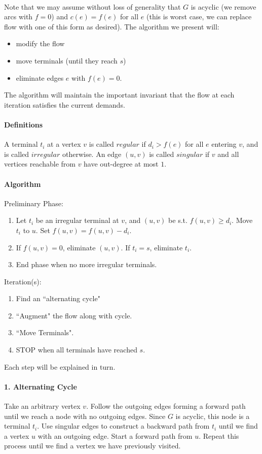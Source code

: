 \documentclass[letterpaper,12pt,oneside,onecolumn]{article}
\begin{document}
\paragraph{}
Note that we may assume without loss of generality that $G$ is acyclic (we remove arcs with $f=0$) and $c(e) = f(e)$ for all $e$ (this is worst case, we can replace flow with one of this form as desired). The algorithm we present will:
\begin{itemize}
\item modify the flow
\item move terminals (until they reach $s$)
\item eliminate edges $e$ with $f(e) = 0$.
\end{itemize}
The algorithm will maintain the important invariant that the flow at each iteration satisfies the current demands.
\paragraph{Definitions}
A terminal $t_i$ at a vertex $v$ is called $\textit{regular}$ if $d_i > f(e)$ for all $e$ entering $v$, and is called $\textit{irregular}$ otherwise. An edge $(u,v)$ is called $\textit{singular}$ if $v$ and all vertices reachable from $v$ have out-degree at most $1$.
\paragraph{Algorithm}
Preliminary Phase:
\begin{enumerate}
\item Let $t_i$ be an irregular terminal at $v$, and $(u,v)$ be s.t. $f(u,v) \geq d_i$. Move $t_i$ to $u$. Set $f(u,v) = f(u,v) - d_i$.
\item If $f(u,v) = 0$, eliminate $(u,v)$. If $t_i = s$, eliminate $t_i$.
\item End phase when no more irregular terminals.
\end{enumerate}
Iteration(s):
\begin{enumerate}
\item Find an ``alternating cycle"
\item ``Augment" the flow along with cycle.
\item ``Move Terminals".
\item STOP when all terminals have reached $s$.
\end{enumerate}
Each step will be explained in turn.
\paragraph{1. Alternating Cycle}
Take an arbitrary vertex $v$. Follow the outgoing edges forming a forward path until we reach a node with no outgoing edges. Since $G$ is acyclic, this node is a terminal $t_i$. Use singular edges to construct a backward path from $t_i$ until we find a vertex $u$ with an outgoing edge. Start a forward path from $u$. Repeat this process until we find a vertex we have previously visited.
\end{document}
